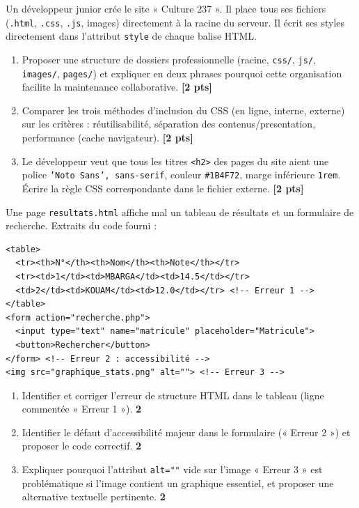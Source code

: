 \documentclass[11pt]{article}
\begin{document}
\begin{exercice}
Un développeur junior crée le site « Culture 237 ». Il place tous ses fichiers (\texttt{.html}, \texttt{.css}, \texttt{.js}, images) directement à la racine du serveur. Il écrit ses styles directement dans l'attribut \texttt{style} de chaque balise HTML.
\begin{enumerate}
    \item Proposer une structure de dossiers professionnelle (racine, \texttt{css/}, \texttt{js/}, \texttt{images/}, \texttt{pages/}) et expliquer en deux phrases pourquoi cette organisation facilite la maintenance collaborative. \hfill\textbf{[2 pts]}
    \item Comparer les trois méthodes d'inclusion du CSS (en ligne, interne, externe) sur les critères : réutilisabilité, séparation des contenus/presentation, performance (cache navigateur). \hfill\textbf{[2 pts]}
    \item Le développeur veut que tous les titres \texttt{<h2>} des pages du site aient une police \texttt{'Noto Sans', sans-serif}, couleur \texttt{\#1B4F72}, marge inférieure \texttt{1rem}. Écrire la règle CSS correspondante dans le fichier externe. \hfill\textbf{[2 pts]}
\end{enumerate}
\end{exercice}

\begin{exercice}
Une page \texttt{resultats.html} affiche mal un tableau de résultats et un formulaire de recherche. Extraits du code fourni :
\begin{verbatim}
<table>
  <tr><th>N°</th><th>Nom</th><th>Note</th></tr>
  <tr><td>1</td><td>MBARGA</td><td>14.5</td></tr>
  <td>2</td><td>KOUAM</td><td>12.0</td></tr> <!-- Erreur 1 -->
</table>
<form action="recherche.php">
  <input type="text" name="matricule" placeholder="Matricule">
  <button>Rechercher</button>
</form> <!-- Erreur 2 : accessibilité -->
<img src="graphique_stats.png" alt=""> <!-- Erreur 3 -->
\end{verbatim}
\begin{enumerate}
    \item Identifier et corriger l'erreur de structure HTML dans le tableau (ligne commentée « Erreur 1 »). \textbf{2}
    \item Identifier le défaut d'accessibilité majeur dans le formulaire (« Erreur 2 ») et proposer le code correctif. \textbf{2}
    \item Expliquer pourquoi l'attribut \texttt{alt=""} vide sur l'image « Erreur 3 » est problématique si l'image contient un graphique essentiel, et proposer une alternative textuelle pertinente. \textbf{2}
\end{enumerate}
\end{exercice}
\end{document}

